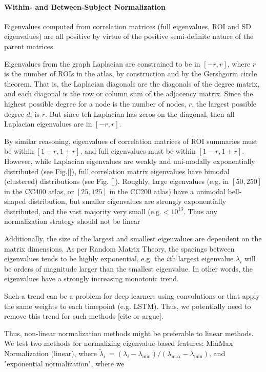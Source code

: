\documentclass[10pt]{article}
\begin{document}
\paragraph{Within- and Between-Subject Normalization}

Eigenvalues computed from correlation matrices (full eigenvalues, ROI and SD eigenvalues)
are all positive by virtue of the positive semi-definite nature of the parent matrices.

Eigenvalues from the graph Laplacian are constrained to be in \([-r, r]\), where \(r\) is the number
of ROIs in the atlas, by construction and by the Gershgorin circle theorem. That is, the Laplacian
diagonals are the diagonals of the degree matrix, and each diagonal is the row or column sum of the
adjacency matrix. Since the highest possible degree for a node is the number of nodes, \(r\), the
largest possible degree \(d_i\) is \(r\). But since teh Laplacian has zeros on the diagonal, then
all Laplacian eigenvalues are in \([-r, r]\).

By similar reasoning, eigenvalues of correlation matrices of ROI summaries must be within \([1 - r,
1 + r]\), and full eigenvalues must be within \([1-r, 1+r]\). However, while Laplacian eigenvalues
are weakly and uni-modally exponentially distributed (see Fig.[]), full correlation matrix
eigenvalues have bimodal (clustered) distributions (see Fig. []).  Roughly, large eigenvalues (e.g.
in \([50, 250]\) in the CC400 atlas, or \([25, 125]\) in the CC200 atlas) have a unimodal
bell-shaped distribution, but smaller eigenvalues are strongly exponentially distributed, and the
vast majority very small (e.g.\(<10^{13}\). Thus any normalization strategy should not be linear

Additionally, the size of the largest and
smallest eigenvalues are dependent on the matrix dimensions. As per Random Matrix Theory, the
spacings between eigenvalues tends to be highly exponential, e.g. the \(i\)th largest eigenvalue
\(\lambda_i\) will be orders of magnitude larger than the smallest eigenvalue. In other words, the
eigenvalues have a strongly increasing monotonic trend.

Such a trend can be a problem for deep learners using convolutions or that apply the same weights to each timepoint (e.g. LSTM). Thus, we potentially need to remove this trend for such methods [cite or argue].

Thus, non-linear
normalization methods might be preferable to linear methods. We test two methods for normalizing
eigenvalue-based features: MinMax Normalization (linear), where \(\tilde{\lambda}_i\ = (\lambda_i -
\lambda_{\text{min}}) / (\lambda_{\text{max}} - \lambda_{\text{min}})\), and "exponential
normalization", where we
\end{document}
